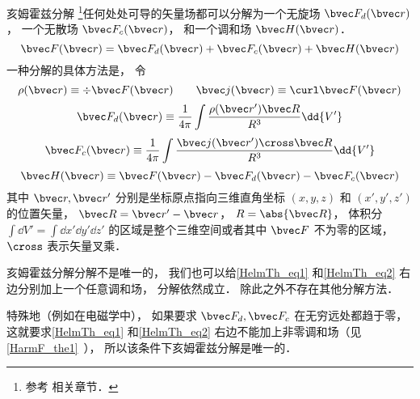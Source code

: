 
\begin{issues}
\issueTODO
\end{issues}


\begin{theorem}{亥姆霍兹分解}
\footnote{参考 \cite{GriffE} 相关章节．}任何处处可导的矢量场都可以分解为一个无旋场 $\bvec F_{d}(\bvec r)$， 一个无散场 $\bvec F_{c}(\bvec r)$， 和一个调和场 $\bvec H(\bvec r)$．
\begin{equation}\label{HelmTh_eq3}
\bvec F(\bvec r) = \bvec F_{d}(\bvec r) + \bvec F_{c}(\bvec r) + \bvec H(\bvec r)
\end{equation}
一种分解的具体方法是， 令
\begin{equation}
\rho(\bvec r) \equiv \div \bvec F(\bvec r) \qquad
\bvec j(\bvec r) \equiv \curl \bvec F(\bvec r)
\end{equation}
\begin{equation}\label{HelmTh_eq1}
\bvec F_{d}(\bvec r) \equiv \frac{1}{4\pi}\int \frac{\rho(\bvec r') \bvec R}{R^3} \dd{V'}
\end{equation}
\begin{equation}\label{HelmTh_eq2}
\bvec F_{c}(\bvec r) \equiv \frac{1}{4\pi}\int \frac{\bvec j(\bvec r')\cross \bvec R}{R^3} \dd{V'}
\end{equation}
\begin{equation}\label{HelmTh_eq4}
\bvec H(\bvec r) \equiv \bvec F(\bvec r) - \bvec F_{d}(\bvec r) - \bvec F_{c}(\bvec r)
\end{equation}
其中 $\bvec r, \bvec r'$ 分别是坐标原点指向三维直角坐标 $(x, y, z)$ 和 $(x', y', z')$ 的位置矢量， $\bvec R = \bvec r' - \bvec r$， $R = \abs{\bvec R}$， 体积分 $\int\dd{V'} = \int\dd{x'}\dd{y'}\dd{z'}$ 的区域是整个三维空间或者其中 $\bvec F$ 不为零的区域， $\cross$ 表示矢量叉乘．

亥姆霍兹分解分解不是唯一的， 我们也可以给\autoref{HelmTh_eq1} 和\autoref{HelmTh_eq2} 右边分别加上一个任意调和场， 分解依然成立． 除此之外不存在其他分解方法．
\end{theorem}

特殊地（例如在电磁学中）， 如果要求 $\bvec F_d, \bvec F_c$ 在无穷远处都趋于零， 这就要求\autoref{HelmTh_eq1} 和\autoref{HelmTh_eq2} 右边不能加上非零调和场（见\autoref{HarmF_the1}~）， 所以该条件下亥姆霍兹分解是唯一的．


